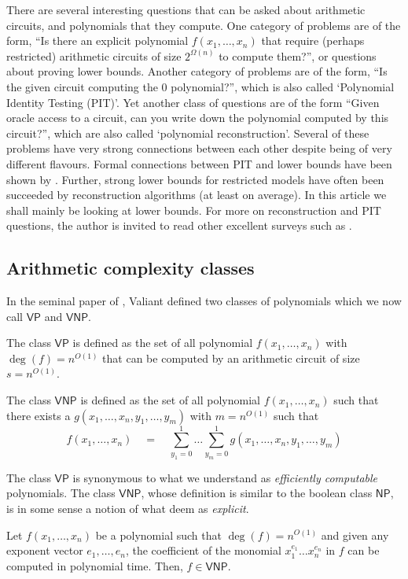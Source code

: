 \documentclass[12pt]{report}
\newcommand{\VP}{\mathsf{VP}}
\newcommand{\VNP}{\mathsf{VNP}}
\newcommand{\NP}{\mathsf{NP}}
\begin{document}
There are several interesting questions that can be asked about arithmetic circuits, and polynomials that they compute. One category of problems are of the form, ``Is there an explicit polynomial $f(x_1,\dots, x_n)$ that require (perhaps restricted) arithmetic circuits of size $2^{\Omega(n)}$ to compute them?'', or questions about proving lower bounds. Another category of problems are of the form, ``Is the given circuit computing the $0$ polynomial?'', which is also called `Polynomial Identity Testing (PIT)'. Yet another class of questions are of the form ``Given oracle access to a circuit, can you write down the polynomial computed by this circuit?'', which are also called `polynomial reconstruction'. Several of these problems have very strong connections between each other despite being of very different flavours. Formal connections between PIT and lower bounds have been shown by \cite{ki03,a05}. Further, strong lower bounds for restricted models have often been succeeded by reconstruction algorithms (at least on average). In this article we shall mainly be looking at lower bounds. For more on reconstruction and PIT questions, the author is invited to read other excellent surveys such as \cite{sy10,ckw11}. 

\subsection{Arithmetic complexity classes}
In the seminal paper of \cite{v79}, Valiant defined two classes of polynomials which we now call $\VP$ and $\VNP$. 

\begin{definition}
The class $\VP$ is defined as the set of all polynomial $f(x_1,\dots, x_n)$ with $\deg(f) = n^{O(1)}$ that can be computed by an arithmetic circuit of size $s = n^{O(1)}$. 

The class $\VNP$ is defined as the set of all polynomial $f(x_1,\dots, x_n)$ such that there exists a $g(x_1,\dots, x_n, y_1,\dots, y_m)$ with $m = n^{O(1)}$ such that
\[
f(x_1,\dots, x_n) \quad = \quad \sum_{y_1=0}^1\dots \sum_{y_m=0}^1 g(x_1,\dots, x_n, y_1,\dots, y_m)
\]
\end{definition}
The class $\VP$ is synonymous to what we understand as \emph{efficiently computable} polynomials. The class $\VNP$, whose definition is similar to the boolean class $\NP$, is in some sense a notion of what deem as \emph{explicit}. 

\begin{fact}\label{fact:VNP-explicit}
Let $f(x_1,\dots, x_n)$ be a polynomial such that $\deg(f) = n^{O(1)}$ and given any exponent vector $e_1,\dots, e_n$, the coefficient of the monomial $x_1^{e_1}\dots x_n^{e_n}$ in $f$ can be computed in polynomial time. Then, $f \in \VNP$. 
\end{fact}
\end{document}
